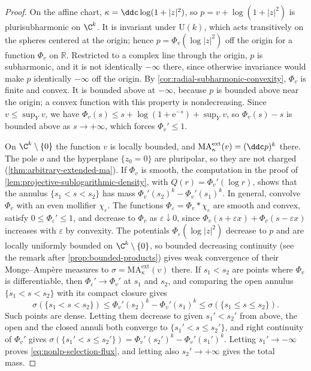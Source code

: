 \begin{proof}
On the affine chart, $\kappa=\ddc\log(1+|z|^2)$, so $p=v+\log(1+|z|^2)$ is plurisubharmonic on $\C^k$. It is invariant under $\mathrm U(k)$, which acts transitively on the spheres centered at the origin; hence $p=\Phi_v(\log|z|^2)$ off the origin for a function $\Phi_v$ on $\mathbb R$. Restricted to a complex line through the origin, $p$ is subharmonic, and it is not identically $-\infty$ there, since otherwise invariance would make $p$ identically $-\infty$ off the origin. By \cref{cor:radial-subharmonic-convexity}, $\Phi_v$ is finite and convex. It is bounded above at $-\infty$, because $p$ is bounded above near the origin; a convex function with this property is nondecreasing. Since $v\leq\sup_Yv$, we have $\Phi_v(s)\leq s+\log(1+\mathrm{e}^{-s})+\sup_Yv$, so $\Phi_v(s)-s$ is bounded above as $s\to+\infty$, which forces $\Phi_v'\leq1$.

On $\C^k\setminus\{0\}$ the function $v$ is locally bounded, and $\mathrm{MA}^{\mathrm{ext}}_\kappa(v)=(\ddc p)^k$ there. The pole $o$ and the hyperplane $\{z_0=0\}$ are pluripolar, so they are not charged (\cref{thm:arbitrary-extended-ma}). If $\Phi_v$ is smooth, the computation in the proof of \cref{lem:projective-sublogarithmic-density}, with $Q(r)=\Phi_v'(\log r)$, shows that the annulus $\{s_1<s<s_2\}$ has mass $\Phi_v'(s_2)^k-\Phi_v'(s_1)^k$. In general, convolve $\Phi_v$ with an even mollifier $\chi_\varepsilon$. The functions $\Phi_\varepsilon=\Phi_v*\chi_\varepsilon$ are smooth and convex, satisfy $0\leq\Phi_\varepsilon'\leq1$, and decrease to $\Phi_v$ as $\varepsilon\downarrow0$, since $\Phi_v(s+\varepsilon x)+\Phi_v(s-\varepsilon x)$ increases with $\varepsilon$ by convexity. The potentials $\Phi_\varepsilon(\log|z|^2)$ decrease to $p$ and are locally uniformly bounded on $\C^k\setminus\{0\}$, so bounded decreasing continuity (see the remark after \cref{prop:bounded-products}) gives weak convergence of their Monge--Amp\`ere measures to $\sigma=\mathrm{MA}^{\mathrm{ext}}_\kappa(v)$ there. If $s_1<s_2$ are points where $\Phi_v$ is differentiable, then $\Phi_\varepsilon'\to\Phi_v'$ at $s_1$ and $s_2$, and comparing the open annulus $\{s_1<s<s_2\}$ with its compact closure gives
\[
 \sigma(\{s_1<s<s_2\})\leq\Phi_v'(s_2)^k-\Phi_v'(s_1)^k\leq\sigma(\{s_1\leq s\leq s_2\}).
\]
Such points are dense. Letting them decrease to given $s_1'<s_2'$ from above, the open and the closed annuli both converge to $\{s_1'<s\leq s_2'\}$, and right continuity of $\Phi_v'$ gives $\sigma(\{s_1'<s\leq s_2'\})=\Phi_v'(s_2')^k-\Phi_v'(s_1')^k$. Letting $s_1'\to-\infty$ proves \eqref{eq:nonlp-selection-flux}, and letting also $s_2'\to+\infty$ gives the total mass.


\end{proof}
